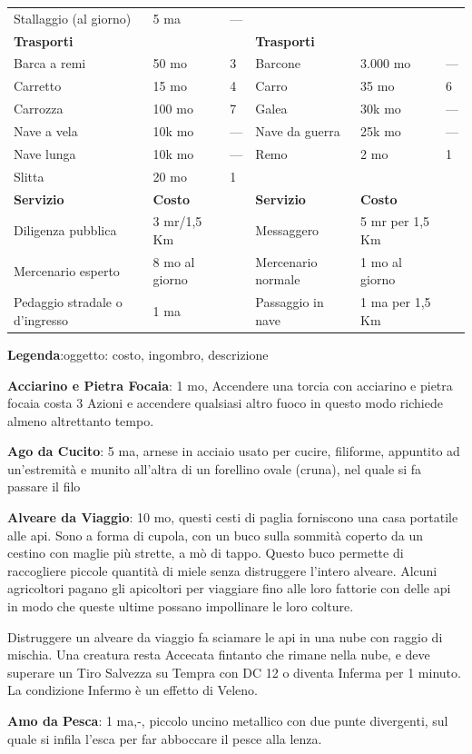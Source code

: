 \documentclass[a4paper,11pt,twoside,openany]{book}
\begin{document}
{\begin{longtable}{|L{4cm} |k{1.5cm} |k{1.5cm}|L{5cm} |k{1.5cm} |k{1.5cm}|}
Stallaggio (al giorno)&5 ma&—&&&\\
\textbf{Trasporti}&&&\textbf{Trasporti}&&\\
Barca a remi&50 mo&3&	Barcone&3.000 mo&—\\
Carretto&15 mo&4&	Carro&35 mo&6\\
Carrozza&100 mo&7&	Galea&30k mo&—\\
Nave a vela&10k mo&—&	Nave da guerra&25k mo&—\\
Nave lunga&10k mo&—&	Remo&2 mo&1\\
Slitta&20 mo&1&&&\\
\textbf{Servizio}&\textbf{Costo}&&\textbf{Servizio}&\textbf{Costo}&\\
Diligenza pubblica&3 mr/1,5 Km&&	Messaggero&5 mr per 1,5 Km&\\
Mercenario esperto&8 mo al giorno&	&Mercenario normale&1 mo al giorno&\\
Pedaggio stradale o d’ingresso&1 ma&&	Passaggio in nave&1 ma per 1,5 Km&\\
\end{longtable}

\bigskip


\textbf{Legenda}:oggetto: costo, ingombro, descrizione

\textbf{Acciarino e Pietra Focaia}: 1 mo, Accendere una torcia con acciarino e pietra focaia costa 3 Azioni e accendere qualsiasi altro fuoco in questo modo richiede almeno altrettanto tempo.

\textbf{Ago da Cucito}: 5 ma, arnese in acciaio usato per cucire, filiforme, appuntito ad un'estremità e munito all'altra di un forellino ovale (cruna), nel quale si fa passare il filo

\textbf{Alveare da Viaggio}: 10 mo, questi cesti di paglia forniscono una casa portatile alle api. Sono a forma di cupola, con un buco sulla sommità coperto da un cestino con maglie più strette, a mò di tappo. Questo buco permette di raccogliere piccole quantità di miele senza distruggere l'intero alveare. Alcuni agricoltori pagano gli apicoltori per viaggiare fino alle loro fattorie con delle api in modo che queste ultime possano impollinare le loro colture.

Distruggere un alveare da viaggio fa sciamare le api in una nube con raggio di mischia. Una creatura resta Accecata fintanto che rimane nella nube, e deve superare un Tiro Salvezza su Tempra con DC 12 o diventa Inferma per 1 minuto. La condizione Infermo è un effetto di Veleno.

\textbf{Amo da Pesca}: 1 ma,-, piccolo uncino metallico con due punte divergenti, sul quale si infila l'esca per far abboccare il pesce alla lenza.

}
\end{document}
